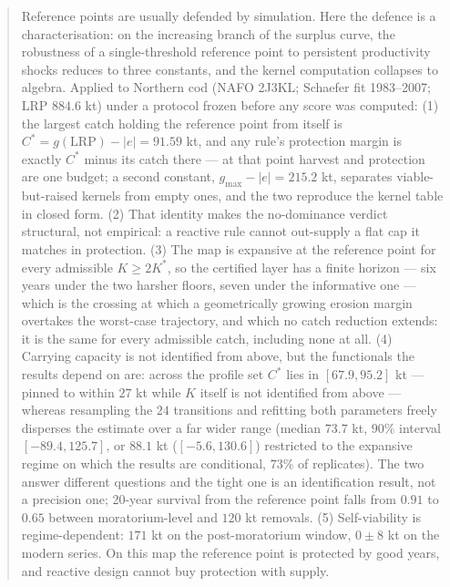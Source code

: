 \begin{abstract}
Reference points are usually defended by simulation. Here the defence is a
characterisation: on the increasing branch of the surplus curve, the
robustness of a single-threshold reference point to persistent productivity
shocks reduces to three constants, and the kernel computation collapses to
algebra. Applied to Northern cod (NAFO 2J3KL; Schaefer fit 1983--2007; LRP
\(884.6\) kt) under a protocol frozen before any score was computed: (1) the
largest catch holding the reference point from itself is
\(C^* = g(\mathrm{LRP}) - |e| = 91.59\) kt, and any rule's protection margin
is exactly \(C^*\) minus its catch there --- at that point harvest and
protection are one budget; a second constant, \(g_{\max} - |e| = 215.2\) kt,
separates viable-but-raised kernels from empty ones, and the two reproduce the
kernel table in closed form. (2) That identity makes the no-dominance verdict
structural, not empirical: a reactive rule cannot out-supply a flat cap it
matches in protection. (3) The map is expansive at the reference point for
every admissible \(K \ge 2K^*\), so the certified layer has a finite horizon
--- six years under the two harsher floors, seven under the informative one
--- which is the crossing at which a geometrically growing erosion margin
overtakes the worst-case trajectory, and which no catch reduction
extends: it is the same for every admissible catch, including none at all.
(4) Carrying capacity is not identified
from above, but the functionals the results depend on are: across the profile
set \(C^*\) lies in \([67.9, 95.2]\) kt --- pinned to within
\(27\) kt while \(K\) itself is not identified from above ---
whereas resampling the \(24\) transitions and refitting both
parameters freely disperses the estimate over a far wider range
(median \(73.7\) kt, \(90\%\) interval \([-89.4, 125.7]\), or
\(88.1\) kt (\([-5.6, 130.6]\)) restricted to the expansive regime on which the
results are conditional, \(73\%\) of replicates). The two answer
different questions and the tight one is an identification result, not a
precision one; 20-year survival from
the reference point falls from \(0.91\) to \(0.65\) between moratorium-level
and \(120\) kt removals. (5) Self-viability is regime-dependent: \(171\) kt
on the post-moratorium window, \(0 \pm 8\) kt on the modern series. On this
map the reference point is protected by good years, and reactive design
cannot buy protection with supply.

\end{abstract}

